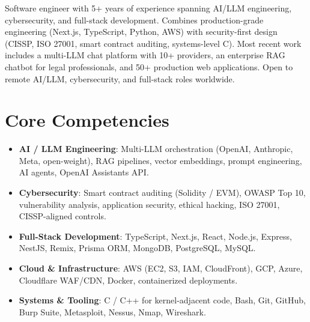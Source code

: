 \documentclass[11pt,a4paper,sans]{moderncv}
\begin{document}
\makecvtitle


\vspace{6pt}
\small{Software engineer with 5+ years of experience spanning AI/LLM engineering, cybersecurity, and full-stack development. Combines production-grade engineering (Next.js, TypeScript, Python, AWS) with security-first design (CISSP, ISO 27001, smart contract auditing, systems-level C). Most recent work includes a multi-LLM chat platform with 10+ providers, an enterprise RAG chatbot for legal professionals, and 50+ production web applications. Open to remote AI/LLM, cybersecurity, and full-stack roles worldwide.}


\section{Core Competencies}
\vspace{1pt}
\begin{itemize}

\item \textbf{AI / LLM Engineering}: Multi-LLM orchestration (OpenAI, Anthropic, Meta, open-weight), RAG pipelines, vector embeddings, prompt engineering, AI agents, OpenAI Assistants API.

\item \textbf{Cybersecurity}: Smart contract auditing (Solidity / EVM), OWASP Top 10, vulnerability analysis, application security, ethical hacking, ISO 27001, CISSP-aligned controls.

\item \textbf{Full-Stack Development}: TypeScript, Next.js, React, Node.js, Express, NestJS, Remix, Prisma ORM, MongoDB, PostgreSQL, MySQL.

\item \textbf{Cloud \& Infrastructure}: AWS (EC2, S3, IAM, CloudFront), GCP, Azure, Cloudflare WAF/CDN, Docker, containerized deployments.

\item \textbf{Systems \& Tooling}: C / C++ for kernel-adjacent code, Bash, Git, GitHub, Burp Suite, Metasploit, Nessus, Nmap, Wireshark.

\end{itemize}
\end{document}
